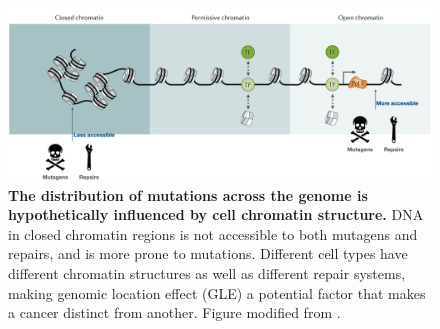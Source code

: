 \begin{figure}[h!]
    \centering
    \includegraphics[scale=0.24]{graphics/chromatin_demo.png}
    \caption{\textbf{The distribution of mutations across the genome is hypothetically influenced by cell chromatin structure.} DNA in closed chromatin regions is not accessible to both mutagens and repairs, and is more prone to mutations. Different cell types have different chromatin structures as well as different repair systems, making genomic location effect (GLE) a potential factor that makes a cancer distinct from another. Figure modified from \citet{Klemm2019ChromatinEpigenome}.}
    \label{fig:chromatin_demo}
\end{figure}

